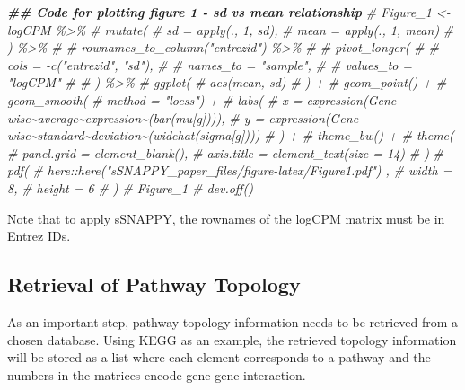 \documentclass[9pt,a4paper,]{extarticle}
\newenvironment{Shaded}{\begin{snugshade}}{\end{snugshade}}
\newcommand{\CommentTok}[1]{\textcolor[rgb]{0.56,0.35,0.01}{\textit{#1}}}
\newcommand{\DocumentationTok}[1]{\textcolor[rgb]{0.56,0.35,0.01}{\textbf{\textit{#1}}}}
\begin{document}
\begin{Shaded}
\begin{Highlighting}[]
\DocumentationTok{\#\# Code for plotting figure 1 {-} sd vs mean relationship}
\CommentTok{\# Figure\_1 \textless{}{-} logCPM \%\textgreater{}\%}
\CommentTok{\#     mutate(}
\CommentTok{\#         sd = apply(., 1, sd), }
\CommentTok{\#         mean = apply(., 1, mean)}
\CommentTok{\#         ) \%\textgreater{}\%}
\CommentTok{\#     \# rownames\_to\_column("entrezid") \%\textgreater{}\%}
\CommentTok{\#     \# pivot\_longer(}
\CommentTok{\#     \#     cols = {-}c("entrezid", "sd"), }
\CommentTok{\#     \#     names\_to = "sample", }
\CommentTok{\#     \#     values\_to = "logCPM"}
\CommentTok{\#     \# ) \%\textgreater{}\%}
\CommentTok{\#     ggplot(}
\CommentTok{\#         aes(mean, sd)}
\CommentTok{\#     ) +}
\CommentTok{\#     geom\_point() +}
\CommentTok{\#     geom\_smooth(}
\CommentTok{\#         method = "loess") +}
\CommentTok{\#     labs(}
\CommentTok{\#         x = expression(Gene{-}wise\textasciitilde{}average\textasciitilde{}expression\textasciitilde{}(bar(mu[g]))), }
\CommentTok{\#         y = expression(Gene{-}wise\textasciitilde{}standard\textasciitilde{}deviation\textasciitilde{}(widehat(sigma[g])))}
\CommentTok{\#     ) +}
\CommentTok{\#     theme\_bw() +}
\CommentTok{\#     theme(}
\CommentTok{\#         panel.grid = element\_blank(), }
\CommentTok{\#         axis.title = element\_text(size = 14)}
\CommentTok{\#     )}
\CommentTok{\# pdf(}
\CommentTok{\#     here::here("sSNAPPY\_paper\_files/figure{-}latex/Figure1.pdf") ,}
\CommentTok{\#     width = 8, }
\CommentTok{\#     height = 6}
\CommentTok{\#     )}
\CommentTok{\# Figure\_1 }
\CommentTok{\# dev.off()}
\end{Highlighting}
\end{Shaded}

Note that to apply sSNAPPY, the rownames of the logCPM matrix must be in Entrez IDs.

\hypertarget{retrieval-of-pathway-topology}{%
\subsection{Retrieval of Pathway Topology}\label{retrieval-of-pathway-topology}}

As an important step, pathway topology information needs to be retrieved from a chosen database.
Using KEGG as an example, the retrieved topology information will be stored as a list where each element corresponds to a pathway and the numbers in the matrices encode gene-gene interaction.
\end{document}
